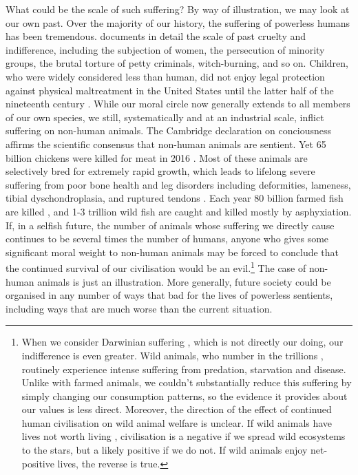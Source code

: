 \documentclass[british]{article}
\begin{document}
What could be the scale of such suffering? By way of illustration, we may look at our own past. Over the majority of our history, the suffering of powerless humans has been tremendous. \cite{pinker_better_2011} documents in detail the scale of past cruelty and indifference, including the subjection of women, the persecution of minority groups, the brutal torture of petty criminals, witch-burning, and so on. Children, who were widely considered less than human, did not enjoy legal protection against physical maltreatment in the United States until the latter half of the nineteenth century \citep[chapter 7]{pinker_better_2011}. While our moral circle now generally extends to all members of our own species, we still, systematically and at an industrial scale, inflict suffering on non-human animals. The Cambridge declaration on conciousness \citep{low_cambridge_2012} affirms the scientific consensus that non-human animals are sentient. Yet 65 billion chickens were killed for meat in 2016 \citep{food_and_agriculture_organization_of_the_united_nations_faostat_????}. Most of these animals are selectively bred for extremely rapid growth, which leads to lifelong severe suffering from poor bone health and leg disorders including deformities, lameness, tibial dyschondroplasia, and ruptured tendons \citep{the_humane_society_of_the_united_states_welfare_2013}. Each year 80 billion farmed fish are killed \citep{mood_estimating_2012}, and 1-3 trillion wild fish are caught \citep{mood_estimating_2010} and killed mostly by asphyxiation. If, in a selfish future, the number of animals whose suffering we directly cause continues to be several times the number of humans, anyone who gives some significant moral weight to non-human animals may be forced to conclude that the continued survival of our civilisation would be an evil.\footnote{
When we consider Darwinian suffering \citep{ng_towards_1995}, which is not directly our doing, our indifference is even greater. Wild animals, who number in the trillions \citep{tomasik_how_2009}, routinely experience intense suffering from predation, starvation and disease. Unlike with farmed animals, we couldn't substantially reduce this suffering by simply changing our consumption patterns, so the evidence it provides about our values is less direct. Moreover, the direction of the effect of continued human civilisation on wild animal welfare is unclear. If wild animals have lives not worth living \citep{tomasik_importance_2015,sittler-adamczewski_consistent_2016}, civilisation is a negative if we spread wild ecosystems to the stars, but a likely positive if we do not. If wild animals enjoy net-positive lives, the reverse is true.} The case of non-human animals is just an illustration. More generally, future society could be organised in any number of ways that bad for the lives of powerless sentients, including ways that are much worse than the current situation.
\end{document}
